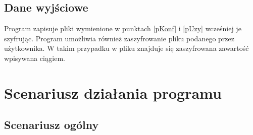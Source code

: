 \documentclass[a4paper]{article}
\begin{document}
\subsection{Dane wyjściowe}
Program zapisuje pliki wymienione w punktach \ref{pKonf} i \ref{pUzy} wcześniej je szyfrując. Program umożliwia również zaszyfrowanie pliku podanego przez użytkownika. W takim przypadku w pliku znajduje się zaszyfrowana zawartość wpisywana ciągiem.

\section{Scenariusz działania programu}

\subsection{Scenariusz ogólny}
\end{document}
